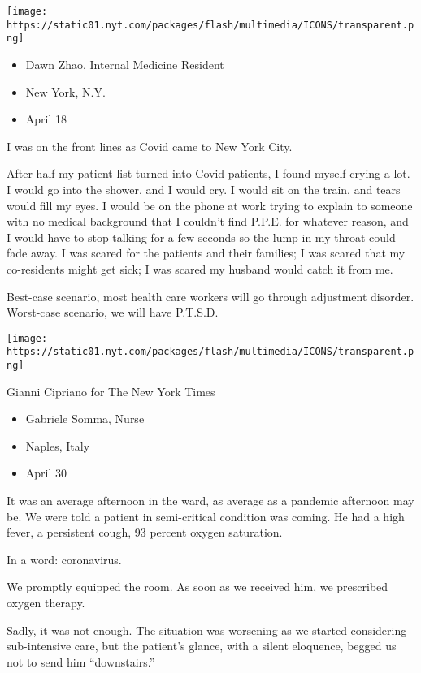 \texttt{[image: https://static01.nyt.com/packages/flash/multimedia/ICONS/transparent.png]}

\begin{itemize}
\tightlist
\item
  Dawn Zhao, Internal Medicine Resident
\item
  New York, N.Y.
\item
  April 18
\end{itemize}

I was on the front lines as Covid came to New York City.

After half my patient list turned into Covid patients, I found myself
crying a lot. I would go into the shower, and I would cry. I would sit
on the train, and tears would fill my eyes. I would be on the phone at
work trying to explain to someone with no medical background that I
couldn't find P.P.E. for whatever reason, and I would have to stop
talking for a few seconds so the lump in my throat could fade away. I
was scared for the patients and their families; I was scared that my
co-residents might get sick; I was scared my husband would catch it from
me.

Best-case scenario, most health care workers will go through adjustment
disorder. Worst-case scenario, we will have P.T.S.D.

\texttt{[image: https://static01.nyt.com/packages/flash/multimedia/ICONS/transparent.png]}

Gianni Cipriano for The New York Times

\begin{itemize}
\tightlist
\item
  Gabriele Somma, Nurse
\item
  Naples, Italy
\item
  April 30
\end{itemize}

It was an average afternoon in the ward, as average as a pandemic
afternoon may be. We were told a patient in semi-critical condition was
coming. He had a high fever, a persistent cough, 93 percent oxygen
saturation.

In a word: coronavirus.

We promptly equipped the room. As soon as we received him, we prescribed
oxygen therapy.

Sadly, it was not enough. The situation was worsening as we started
considering sub-intensive care, but the patient's glance, with a silent
eloquence, begged us not to send him ``downstairs.''


